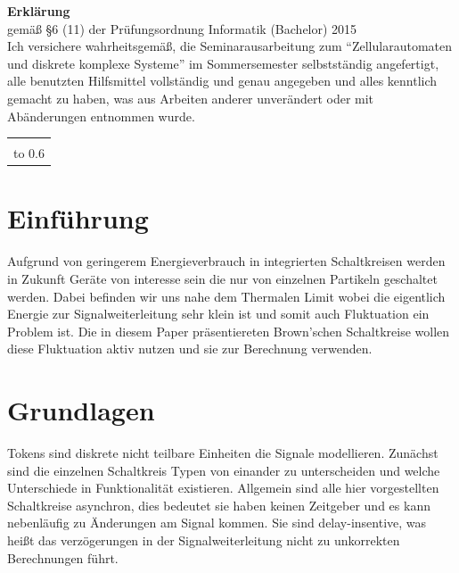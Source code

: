 {\thispagestyle{empty}\raggedright

\noindent \textbf{\Large Erklärung}\\[1ex]
gemäß \S 6 (11) der Prüfungsordnung Informatik %
(Bachelor) 2015 %
\\[\baselineskip]

\noindent
Ich versichere wahrheitsgemäß, die Seminarausarbeitung zum
\seminarart{} "`Zellularautomaten und diskrete komplexe Systeme"' im
Sommersemester \seminarjahr{} selbstständig angefertigt, alle
benutzten Hilfsmittel vollständig und genau angegeben und alles
kenntlich gemacht zu haben, was aus Arbeiten anderer unverändert oder
mit Abänderungen entnommen wurde.

\vspace*{30mm}
\noindent
\begin{tabular}{@{}l}
  \hline
   \\[-1ex]
  \hbox to 0.6\textwidth{(\teilnehmername, Matr.nr.~\teilnehmermatrnr) \hss}
\end{tabular}
}
\clearpage

\section{Einführung}
Aufgrund von geringerem Energieverbrauch in integrierten Schaltkreisen
werden in Zukunft Geräte von interesse sein die nur von einzelnen 
Partikeln geschaltet werden.
%
Dabei befinden wir uns nahe dem Thermalen Limit wobei die eigentlich
Energie zur Signalweiterleitung sehr klein ist und somit auch
Fluktuation ein Problem ist.
%
Die in diesem Paper präsentiereten Brown'schen Schaltkreise wollen
diese Fluktuation aktiv nutzen und sie zur Berechnung verwenden.


\section{Grundlagen}
Tokens sind diskrete nicht teilbare Einheiten die Signale modellieren.
%
Zunächst sind die einzelnen Schaltkreis Typen von einander zu unterscheiden 
und welche Unterschiede in Funktionalität existieren.
%
Allgemein sind alle hier vorgestellten Schaltkreise asynchron, dies bedeutet sie
haben keinen Zeitgeber und es kann nebenläufig zu Änderungen am Signal kommen.
%
Sie sind delay-insentive, was heißt das verzögerungen in der Signalweiterleitung
nicht zu unkorrekten Berechnungen führt.


